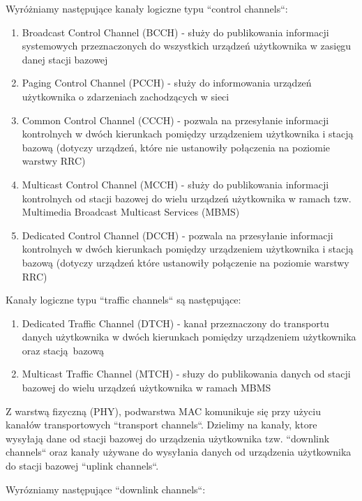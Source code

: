 Wyróżniamy następujące kanały logiczne typu ``control channels``:

\begin{enumerate}
	\item Broadcast Control Channel (BCCH) - służy do publikowania informacji systemowych przeznaczonych do wszystkich urządzeń użytkownika w zasięgu danej stacji bazowej
	\item Paging Control Channel (PCCH) - służy do informowania urządzeń użytkownika o zdarzeniach zachodzących w sieci
	\item Common Control Channel (CCCH) - pozwala na przesyłanie informacji kontrolnych w dwóch kierunkach pomiędzy urządzeniem użytkownika i stacją bazową (dotyczy urządzeń, które nie ustanowiły połączenia na poziomie warstwy RRC)
	\item Multicast Control Channel (MCCH) - służy do publikowania informacji kontrolnych od stacji bazowej do wielu urządzeń użytkownika w ramach tzw. Multimedia Broadcast Multicast Services (MBMS)
	\item Dedicated Control Channel (DCCH) - pozwala na przesyłanie informacji kontrolnych w dwóch kierunkach pomiędzy urządzeniem użytkownika i stacją bazową (dotyczy urządzeń które ustanowiły połączenie na poziomie warstwy RRC)
\end{enumerate}

Kanały logiczne typu ``traffic channels`` są następujące:

\begin{enumerate}
	\item Dedicated Traffic Channel (DTCH) - kanał przeznaczony do transportu danych użytkownika w dwóch kierunkach pomiędzy urządzeniem użytkownika oraz stacją bazową
	\item Multicast Traffic Channel (MTCH) - słuzy do publikowania danych od stacji bazowej do wielu urządzeń użytkownika w ramach MBMS
\end{enumerate}

Z warstwą fizyczną (PHY), podwarstwa MAC komunikuje się przy użyciu kanałów transportowych ``transport channels``. Dzielimy na kanały, ktore wysyłają dane od stacji bazowej do urządzenia użytkownika tzw. ``downlink channels`` oraz kanały używane do wysyłania danych od urządzenia użytkownika do stacji bazowej ``uplink channels``.

Wyrózniamy następujące ``downlink channels``:

